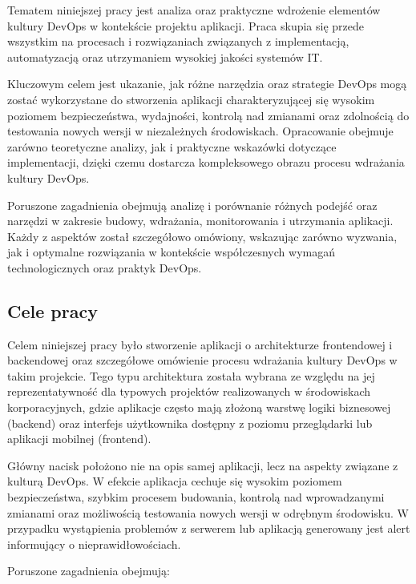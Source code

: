 \documentclass{article}
\begin{document}
Tematem niniejszej pracy jest analiza oraz praktyczne wdrożenie elementów kultury DevOps w kontekście projektu aplikacji. Praca skupia się przede wszystkim na procesach i rozwiązaniach związanych z implementacją, automatyzacją oraz utrzymaniem wysokiej jakości systemów IT. 

Kluczowym celem jest ukazanie, jak różne narzędzia oraz strategie DevOps mogą zostać wykorzystane do stworzenia aplikacji charakteryzującej się wysokim poziomem bezpieczeństwa, wydajności, kontrolą nad zmianami oraz zdolnością do testowania nowych wersji w niezależnych środowiskach. Opracowanie obejmuje zarówno teoretyczne analizy, jak i praktyczne wskazówki dotyczące implementacji, dzięki czemu dostarcza kompleksowego obrazu procesu wdrażania kultury DevOps.

Poruszone zagadnienia obejmują analizę i porównanie różnych podejść oraz narzędzi w zakresie budowy, wdrażania, monitorowania i utrzymania aplikacji. Każdy z aspektów został szczegółowo omówiony, wskazując zarówno wyzwania, jak i optymalne rozwiązania w kontekście współczesnych wymagań technologicznych oraz praktyk DevOps.

\subsection{Cele pracy}

Celem niniejszej pracy było stworzenie aplikacji o architekturze frontendowej i backendowej oraz szczegółowe omówienie procesu wdrażania kultury DevOps w takim projekcie. Tego typu architektura została wybrana ze względu na jej reprezentatywność dla typowych projektów realizowanych w środowiskach korporacyjnych, gdzie aplikacje często mają złożoną warstwę logiki biznesowej (backend) oraz interfejs użytkownika dostępny z poziomu przeglądarki lub aplikacji mobilnej (frontend).

Główny nacisk położono nie na opis samej aplikacji, lecz na aspekty związane z kulturą DevOps. W efekcie aplikacja cechuje się wysokim poziomem bezpieczeństwa, szybkim procesem budowania, kontrolą nad wprowadzanymi zmianami oraz możliwością testowania nowych wersji w odrębnym środowisku. W przypadku wystąpienia problemów z serwerem lub aplikacją generowany jest alert informujący o nieprawidłowościach.

Poruszone zagadnienia obejmują:
\end{document}
